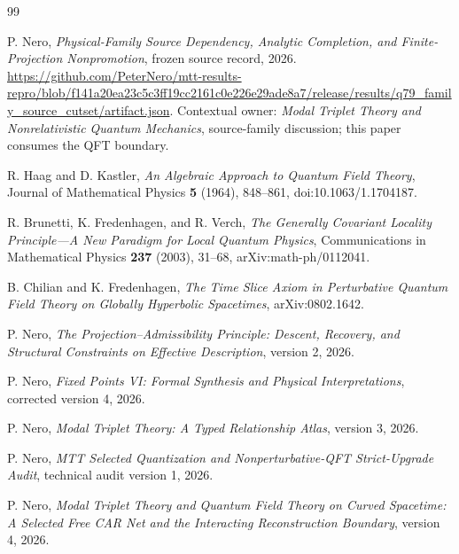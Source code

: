 \documentclass[11pt]{article}
\begin{document}
\begin{thebibliography}{99}

P. Nero, \emph{Physical-Family Source Dependency, Analytic Completion, and
Finite-Projection Nonpromotion}, frozen source record, 2026.
\url{https://github.com/PeterNero/mtt-results-repro/blob/f141a20ea23c5c3ff19cc2161c0e226e29ade8a7/release/results/q79_family_source_cutset/artifact.json}.
Contextual owner: \emph{Modal Triplet Theory and Nonrelativistic Quantum
Mechanics}, source-family discussion; this paper consumes the QFT boundary.

R. Haag and D. Kastler,
\emph{An Algebraic Approach to Quantum Field Theory},
Journal of Mathematical Physics \textbf{5} (1964), 848--861,
doi:10.1063/1.1704187.

R. Brunetti, K. Fredenhagen, and R. Verch,
\emph{The Generally Covariant Locality Principle---A New Paradigm for Local
Quantum Physics},
Communications in Mathematical Physics \textbf{237} (2003), 31--68,
arXiv:math-ph/0112041.

B. Chilian and K. Fredenhagen,
\emph{The Time Slice Axiom in Perturbative Quantum Field Theory on Globally
Hyperbolic Spacetimes},
arXiv:0802.1642.

P. Nero,
\emph{The Projection--Admissibility Principle: Descent, Recovery, and
Structural Constraints on Effective Description}, version 2, 2026.

P. Nero,
\emph{Fixed Points VI: Formal Synthesis and Physical Interpretations},
corrected version 4, 2026.

P. Nero,
\emph{Modal Triplet Theory: A Typed Relationship Atlas}, version 3, 2026.

P. Nero,
\emph{MTT Selected Quantization and Nonperturbative-QFT Strict-Upgrade Audit},
technical audit version 1, 2026.

P. Nero,
\emph{Modal Triplet Theory and Quantum Field Theory on Curved Spacetime: A
Selected Free CAR Net and the Interacting Reconstruction Boundary},
version 4, 2026.

\end{thebibliography}
\end{document}

